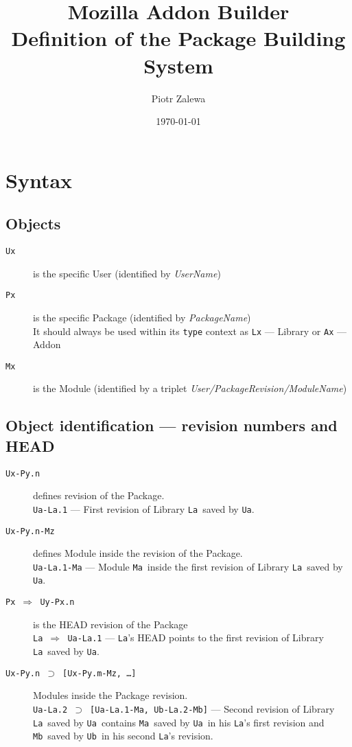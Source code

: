 \documentclass[10pt]{article}
\title{Mozilla Addon Builder\\ Definition of the Package Building System}
\author{Piotr Zalewa}
\date{\today}
\def\Ua{{\tt Ua}}
\def\Ub{{\tt Ub}}
\def\La{{\tt La}}
\def\Ma{{\tt Ma}}
\def\Mb{{\tt Mb}}
\def\headsto{${\Longrightarrow}$ }
\def\hto{\headsto}
\def\eq{${\supset}$ }
\begin{document}
\maketitle

\section{Syntax}

	\subsection{Objects}
	\begin{description}
		\item[{\tt Ux}] is the specific User (identified by {\em UserName})
		\item[{\tt Px}] is the specific Package (identified by {\em PackageName})\\
			It should always be used within its {\tt type} context as {\tt Lx} --- Library or {\tt Ax} --- Addon
		\item[{\tt Mx}] is the Module (identified by a triplet {\em User/PackageRevision/ModuleName})
	\end{description}

	\subsection{Object identification --- revision numbers and HEAD}
	\begin{description}
		\item[{\tt Ux-Py.n}] defines revision of the Package.\\ 
			{\tt Ua-La.1} --- First revision of Library \La\ saved by \Ua.
		\item[{\tt Ux-Py.n-Mz}] defines Module inside the revision of the Package. \\ 
			{\tt Ua-La.1-Ma} --- Module \Ma\ inside the first revision of Library \La\ saved by \Ua.
		\item[{\tt Px \hto  Uy-Px.n}] is the HEAD revision of the Package\\ 
			{\tt La \hto  Ua-La.1} --- \La's HEAD points to the first revision of Library \La\ saved by \Ua.
		\item[{\tt Ux-Py.n \eq [Ux-Py.m-Mz, \ldots]}] Modules inside the Package revision.\\ 
			{\tt Ua-La.2 \eq [Ua-La.1-Ma, Ub-La.2-Mb]} --- Second revision of Library \La\ saved by \Ua\ contains \Ma\ saved by \Ua\ in his \La's first revision and \Mb\ saved by \Ub\ in his second \La's revision.
	\end{description}
\end{document}
